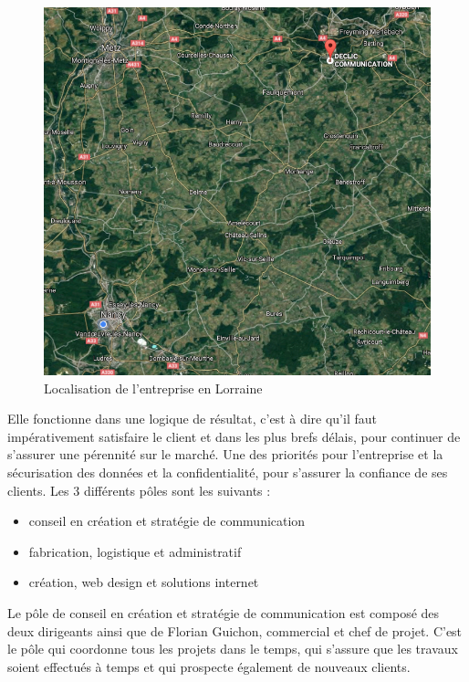 \documentclass[report]{tnreport}
\begin{document}
\setlength{\belowcaptionskip}{5pt}
\begin{figure}[h]
  \centering
  \includegraphics[width=13cm]{figures/map_plan}
  \caption{Localisation de l'entreprise en Lorraine}
  
  \label{fig:localisation}
\end{figure}
Elle fonctionne dans une logique de résultat, c’est à dire qu’il faut impérativement satisfaire le client et dans les plus brefs délais, pour continuer de s’assurer une pérennité sur le marché. Une des priorités pour l’entreprise et la sécurisation des données et la confidentialité, pour s’assurer la confiance de ses clients.
Les 3 différents pôles sont les suivants :
\begin{itemize}
\item conseil en création et stratégie de communication
\item fabrication, logistique et administratif
\item création, web design et solutions internet
\end{itemize}


Le pôle de conseil en création et stratégie de communication est composé des deux dirigeants ainsi que de Florian Guichon, commercial et chef de projet. C’est le pôle qui coordonne tous les projets dans le temps, qui s’assure que les travaux soient effectués à temps et qui prospecte également de nouveaux clients.
\end{document}
